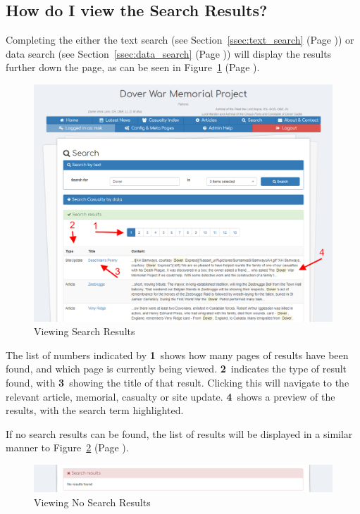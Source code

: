 \documentclass[12pt]{article}
\newcommand{\marker}[1]{\color{red}\textbf{#1}\color{black}}
\newcommand{\myref}[1]{\ref{#1} {\scriptsize(Page \pageref{#1})}}
\begin{document}
\newpage
\FloatBarrier
\subsection{How do I view the Search Results?}\label{ssec:view_search}
Completing the either the text search (see Section~\myref{ssec:text_search}) or data search (see Section~\myref{ssec:data_search}) will display the results further down the page, as can be seen in Figure~\myref{fig:view_search}.

\begin{figure}[h]
  \centering
 \includegraphics[width=.9\textwidth]{pics/view_search.png}
	\caption{Viewing Search Results}\label{fig:view_search}
\end{figure}

The list of numbers indicated by \marker{1}\ shows how many pages of results have been found, and which page is currently being viewed. \marker{2}\ indicates the type of result found, with \marker{3}\ showing the title of that result. Clicking this will navigate to the relevant article, memorial, casualty or site update. \marker{4}\ shows a preview of the results, with the search term highlighted.

If no search results can be found, the list of results will be displayed in a similar manner to Figure~\myref{fig:no_search}.

\begin{figure}[h]
  \centering
 \includegraphics[width=.9\textwidth]{pics/no_search.png}
	\caption{Viewing No Search Results}\label{fig:no_search}
\end{figure}
\end{document}
